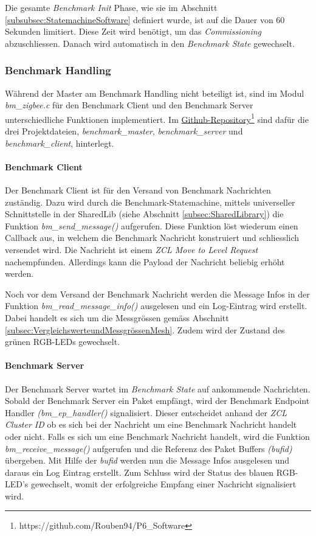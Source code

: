 Die gesamte \textit{Benchmark Init} Phase, wie sie im Abschnitt \ref{subsubsec:StatemachineSoftware} definiert wurde, ist auf die Dauer von 60 Sekunden limitiert.
Diese Zeit wird benötigt, um das \textit{Commissioning} abzuschliessen.
Danach wird automatisch in den \textit{Benchmark State} gewechselt.

\subsubsection{Benchmark Handling}\label{subsubsec:ZigbeeBenchmarkHandling}
Während der Master am Benchmark Handling nicht beteiligt ist,  sind im Modul \textit{bm\_zigbee.c} für den Benchmark Client und den Benchmark Server unterschiedliche Funktionen implementiert.
Im \href{https://github.com/Rouben94/P6_Software}{Github-Repository\footnote{\url{https://github.com/Rouben94/P6_Software}\cite{anklin_bobst_horath_rouben94p6_software_nodate}}} sind dafür die drei Projektdateien, \textit{benchmark\_master}, \textit{benchmark\_server} und \textit{benchmark\_client}, hinterlegt.

\paragraph{Benchmark Client}
Der Benchmark Client ist für den Versand von Benchmark Nachrichten zuständig.
Dazu wird durch die Benchmark-Statemachine, mittels universeller Schnittstelle in der SharedLib (siehe Abschnitt \ref{subsec:SharedLibrary}) die Funktion \textit{bm\_send\_message()} aufgerufen.
Diese Funktion löst wiederum einen Callback aus, in welchem die Benchmark Nachricht konstruiert und schliesslich versendet wird.
Die Nachricht ist einem \textit{ZCL Move to Level Request} nachempfunden.
Allerdings kann die Payload der Nachricht beliebig erhöht werden.

Noch vor dem Versand der Benchmark Nachricht werden die Message Infos in der Funktion \textit{bm\_read\_message\_info()} ausgelesen und ein Log-Eintrag wird erstellt.
Dabei handelt es sich um die Messgrössen gemäss Abschnitt \ref{subsec:VergleichswerteundMessgrössenMesh}.
Zudem wird der Zustand des grünen RGB-LEDs gewechselt.

\paragraph{Benchmark Server}
Der Benchmark Server wartet im \textit{Benchmark State} auf ankommende Nachrichten.
Sobald der Benchmark Server ein Paket empfängt, wird der Benchmark Endpoint Handler \textit{(bm\_ep\_handler()} signalisiert.
Dieser entscheidet anhand der \textit{ZCL Cluster ID} ob es sich bei der Nachricht um eine Benchmark Nachricht handelt oder nicht.
Falls es sich um eine Benchmark Nachricht handelt, wird die Funktion \textit{bm\_receive\_message()} aufgerufen und die Referenz des Paket Buffers \textit{(bufid)} übergeben.
Mit Hilfe der \textit{bufid} werden nun die Message Infos ausgelesen und daraus ein Log Eintrag erstellt.
Zum Schluss wird der Status des blauen RGB-LED's gewechselt, womit der erfolgreiche Empfang einer Nachricht signalisiert wird.

